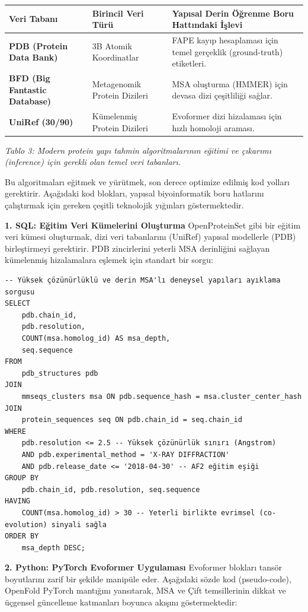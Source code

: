 \documentclass[11pt,a4paper]{article}
\begin{document}
\begin{longtable}{>{\raggedright\arraybackslash}p{}>{\raggedright\arraybackslash}p{}>{\raggedright\arraybackslash}p{}}
\toprule
\textbf{Veri Tabanı} & \textbf{Birincil Veri Türü} & \textbf{Yapısal Derin Öğrenme Boru Hattındaki İşlevi} \\
\midrule
\endhead
\textbf{PDB (Protein Data Bank)} & 3B Atomik Koordinatlar & FAPE kayıp hesaplaması için temel gerçeklik (ground-truth) etiketleri. \\
\textbf{BFD (Big Fantastic Database)} & Metagenomik Protein Dizileri & MSA oluşturma (HMMER) için devasa dizi çeşitliliği sağlar. \\
\textbf{UniRef (30/90)} & Kümelenmiş Protein Dizileri & Evoformer dizi hizalaması için hızlı homoloji araması. \\
\bottomrule
\end{longtable}
\textit{Tablo 3: Modern protein yapı tahmin algoritmalarının eğitimi ve çıkarımı (inference) için gerekli olan temel veri tabanları.}

Bu algoritmaları eğitmek ve yürütmek, son derece optimize edilmiş kod yolları gerektirir. Aşağıdaki kod blokları, yapısal biyoinformatik boru hatlarını çalıştırmak için gereken çeşitli teknolojik yığınları göstermektedir.

\textbf{1. SQL: Eğitim Veri Kümelerini Oluşturma} OpenProteinSet gibi bir eğitim veri kümesi oluşturmak, dizi veri tabanlarını (UniRef) yapısal modellerle (PDB) birleştirmeyi gerektirir. PDB zincirlerini yeterli MSA derinliğini sağlayan kümelenmiş hizalamalara eşlemek için standart bir sorgu:

\begin{Verbatim}[breaklines=true,breakanywhere=true,fontsize=\small]
-- Yüksek çözünürlüklü ve derin MSA'lı deneysel yapıları ayıklama sorgusu
SELECT 
    pdb.chain_id,
    pdb.resolution,
    COUNT(msa.homolog_id) AS msa_depth,
    seq.sequence
FROM 
    pdb_structures pdb
JOIN 
    mmseqs_clusters msa ON pdb.sequence_hash = msa.cluster_center_hash
JOIN 
    protein_sequences seq ON pdb.chain_id = seq.chain_id
WHERE 
    pdb.resolution <= 2.5 -- Yüksek çözünürlük sınırı (Angstrom)
    AND pdb.experimental_method = 'X-RAY DIFFRACTION'
    AND pdb.release_date <= '2018-04-30' -- AF2 eğitim eşiği
GROUP BY 
    pdb.chain_id, pdb.resolution, seq.sequence
HAVING 
    COUNT(msa.homolog_id) > 30 -- Yeterli birlikte evrimsel (co-evolution) sinyali sağla
ORDER BY 
    msa_depth DESC;
\end{Verbatim}
\textbf{2. Python: PyTorch Evoformer Uygulaması} Evoformer blokları tansör boyutlarını zarif bir şekilde manipüle eder. Aşağıdaki sözde kod (pseudo-code), OpenFold PyTorch mantığını yansıtarak, MSA ve Çift temsillerinin dikkat ve üçgensel güncelleme katmanları boyunca akışını göstermektedir:
\end{document}

